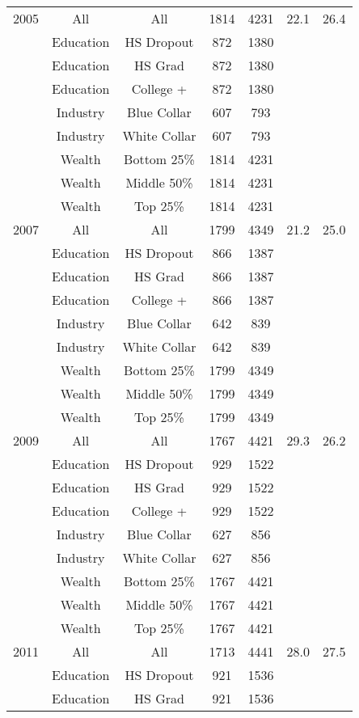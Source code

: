 \begin{tabular}{||l|c|c|c|c|c||}
    2005 & All & All & 1814 & 4231 & 22.1 & 26.4 \\
    & Education & HS Dropout & 872 & 1380 & & \\
    & Education & HS Grad & 872 & 1380 & & \\
    & Education & College + & 872 & 1380 & & \\
    & Industry & Blue Collar & 607 & 793 & & \\
    & Industry & White Collar & 607 & 793 & & \\
    & Wealth & Bottom 25\% & 1814 & 4231 & & \\
    & Wealth & Middle 50\% & 1814 & 4231 & & \\
    & Wealth & Top 25\% & 1814 & 4231 & & \\
    2007 & All & All & 1799 & 4349 & 21.2 & 25.0 \\
    & Education & HS Dropout & 866 & 1387 & & \\
    & Education & HS Grad & 866 & 1387 & & \\
    & Education & College + & 866 & 1387 & & \\
    & Industry & Blue Collar & 642 & 839 & & \\
    & Industry & White Collar & 642 & 839 & & \\
    & Wealth & Bottom 25\% & 1799 & 4349 & & \\
    & Wealth & Middle 50\% & 1799 & 4349 & & \\
    & Wealth & Top 25\% & 1799 & 4349 & & \\
    2009 & All & All & 1767 & 4421 & 29.3 & 26.2 \\
    & Education & HS Dropout & 929 & 1522 & & \\
    & Education & HS Grad & 929 & 1522 & & \\
    & Education & College + & 929 & 1522 & & \\
    & Industry & Blue Collar & 627 & 856 & & \\
    & Industry & White Collar & 627 & 856 & & \\
    & Wealth & Bottom 25\% & 1767 & 4421 & & \\
    & Wealth & Middle 50\% & 1767 & 4421 & & \\
    & Wealth & Top 25\% & 1767 & 4421 & & \\
    2011 & All & All & 1713 & 4441 & 28.0 & 27.5 \\
    & Education & HS Dropout & 921 & 1536 & & \\
    & Education & HS Grad & 921 & 1536 & & \\

\end{tabular}
